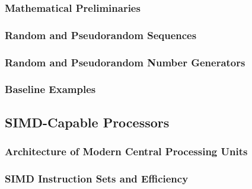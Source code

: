 \documentclass{stdlocal}
\begin{document}
    \subsubsection*{Mathematical Preliminaries} %
    \label{ssub:mathematical_preliminaries}


    \subsubsection*{Random and Pseudorandom Sequences} %
    \label{ssub:random_and_pseudorandom_sequences}


    \subsubsection*{Random and Pseudorandom Number Generators} %
    \label{ssub:random_and_pseudorandom_number_generators}


    \subsubsection*{Baseline Examples} %
    \label{ssub:baseline_examples}


  \subsection{SIMD-Capable Processors} %
  \label{sub:simd-capable_processors}
    \subsubsection*{Architecture of Modern Central Processing Units} %
    \label{ssub:architecture_of_modern_central_processing_units}


    \subsubsection*{SIMD Instruction Sets and Efficiency} %
    \label{ssub:simd_instruction_sets_and_efficiency}
\end{document}

